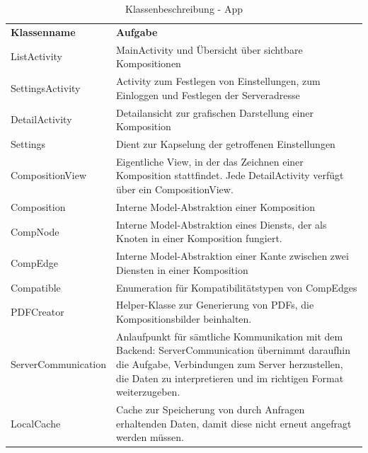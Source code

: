 \begin{table}[h]
	\centering
	\begin{tabularx}{\textwidth}{X X}
		\rowcolor[HTML]{C0C0C0} 
		\textbf{Klassenname} & \textbf{Aufgabe} \\
		ListActivity & MainActivity und Übersicht über sichtbare Kompositionen  \\
		\rowcolor[HTML]{E7E7E7} 
		SettingsActivity & Activity zum Festlegen von Einstellungen, zum Einloggen und Festlegen der Serveradresse \\
		DetailActivity & Detailansicht zur grafischen Darstellung einer Komposition \\
		\rowcolor[HTML]{E7E7E7} 
		Settings & Dient zur Kapselung der getroffenen Einstellungen \\
		CompositionView & Eigentliche View, in der das Zeichnen einer Komposition stattfindet. Jede DetailActivity verfügt über ein CompositionView. \\
		\rowcolor[HTML]{E7E7E7} 
		Composition & Interne Model-Abstraktion einer Komposition \\
		CompNode & Interne Model-Abstraktion eines Diensts, der als Knoten in einer Komposition fungiert. \\
		\rowcolor[HTML]{E7E7E7} 
		CompEdge & Interne Model-Abstraktion einer Kante zwischen zwei Diensten in einer Komposition \\
		Compatible & Enumeration für Kompatibilitätstypen von CompEdges \\
		\rowcolor[HTML]{E7E7E7} 
		PDFCreator & Helper-Klasse zur Generierung von PDFs, die Kompositionsbilder beinhalten. \\
		ServerCommunication & Anlaufpunkt für sämtliche Kommunikation mit dem Backend: ServerCommunication übernimmt daraufhin die Aufgabe, Verbindungen zum Server herzustellen, die Daten zu interpretieren und im richtigen Format weiterzugeben. \\
		\rowcolor[HTML]{E7E7E7} 
		LocalCache & Cache zur Speicherung von durch Anfragen erhaltenden Daten, damit diese nicht erneut angefragt werden müssen.
	\end{tabularx}
	\caption{Klassenbeschreibung - App}
	\label{table:klassenbeschreibung-a}
\end{table}
